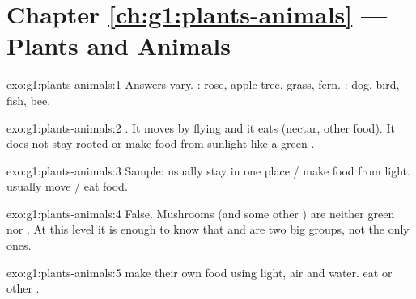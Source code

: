 \section*{Chapter \ref{ch:g1:plants-animals} --- Plants and Animals}

\begin{solution}{exo:g1:plants-animals:1}
Answers vary. : rose, apple tree, grass, fern. : dog,
bird, fish, bee.
\end{solution}

\begin{solution}{exo:g1:plants-animals:2}
. It moves by flying and it eats (nectar, other food). It
does not stay rooted or make food from sunlight like a green .
\end{solution}

\begin{solution}{exo:g1:plants-animals:3}
Sample:  usually stay in one place / make food from light.
 usually move / eat food.
\end{solution}

\begin{solution}{exo:g1:plants-animals:4}
False. Mushrooms (and some other ) are neither green
 nor . At this level it is enough to know that 
and  are two big groups, not the only ones.
\end{solution}

\begin{solution}{exo:g1:plants-animals:5}
 make their own food using light, air and water.  eat
 or other .
\end{solution}

